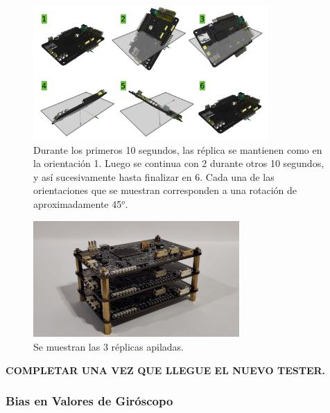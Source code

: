 \begin{figure}[H]
    \centering
    \includegraphics[width=0.8\textwidth]{img/orientaciones_prueba.png}
    \caption{Durante los primeros 10 segundos, las réplica se mantienen como en la orientación 1. Luego se continua con 2 durante otros 10 segundos, y así sucesivamente hasta finalizar en 6. Cada una de las orientaciones que se muestran corresponden a una rotación de aproximadamente 45$^o$.}
    \label{fig:orientaciones_prueba}
\end{figure}

\begin{figure}[H]
    \centering
    \includegraphics[width=0.7\textwidth]{img/pruebas_stackeadas.png}
    \caption{Se muestran las 3 réplicas apiladas.}
    \label{fig:pruebas_stackeadas}
\end{figure}



{\Large \textbf{{\color{red} COMPLETAR UNA VEZ QUE LLEGUE EL NUEVO TESTER.}}}


\subsubsection{Bias en Valores de Giróscopo}

